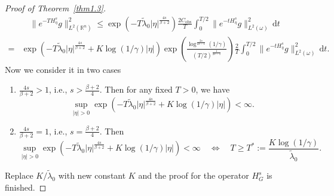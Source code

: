 \documentclass{article}
\numberwithin{equation}{section}
\renewcommand{\d}{\,\mathrm{d}}
\newcommand\R{\ensuremath{\mathbb{R}}}
\numberwithin{equation}{section}
\theoremstyle{definition}
\begin{document}
\begin{proof}[Proof of Theorem~\ref{thm1.3}]
\begin{equation*}
	\begin{aligned}
		&\quad \|e^{-TH^{s}_{\eta}}g\|^2_{L^2(\R^{n})}\le \exp\left(-T \widetilde{\lambda}_0|\eta|^{\frac{4s}{\beta+2}}\right)  \frac{2C_{\mathrm{obs}}}{T}\int_0^{T /2} \|e^{-tH^{s}_{\eta}}g\|^2_{L^2(\omega)}\d t\\
		=& \exp\left( - T \widetilde{\lambda}_0 |\eta|^{\frac{4s}{\beta+2}} +K\log(1 /\gamma) |\eta|\right)\exp\left( \frac{\log^{\frac{2s}{2s-1}}(1 /\gamma)}{(T /2)^{\frac{1}{2s-1}}} \right)\frac{2}{T} \int_0^{T /2} \|e^{-tH_{\eta}^{s}}g\|^2_{L^2(\omega)}\d t.  
	\end{aligned} 
\end{equation*}
Now we consider it in two cases
\begin{enumerate}
	\item $\displaystyle \frac{4s}{\beta +2}>1$, i.e., $\displaystyle s>\frac{\beta +2}{4}$. Then for any fixed $T>0$, we have
		\begin{equation*}
			\sup_{|\eta|>0}\exp\left(-T \widetilde{\lambda}_0 |\eta|^{\frac{4s}{\beta +2}}+K\log(1 /\gamma)|\eta|  \right) <\infty.
		\end{equation*}
	\item $\displaystyle \frac{4s}{\beta +2}=1$, i.e., $\displaystyle s= \frac{\beta +2}{4}$. Then
		\[
			\sup_{|\eta|>0}\exp\left(-T \widetilde{\lambda}_0 |\eta|^{\frac{4s}{\beta +2}}+K\log(1 /\gamma)|\eta|  \right) <\infty \quad \Longleftrightarrow \quad T\ge T^{*}:= \frac{K\log(1 /\gamma)}{\widetilde{\lambda}_0}.
		\]
\end{enumerate}
Replace $K /\widetilde{\lambda}_0$ with new constant $K$ and the proof for the operator $H_{G}^{s}$ is finished. 
\end{proof}
\end{document}
